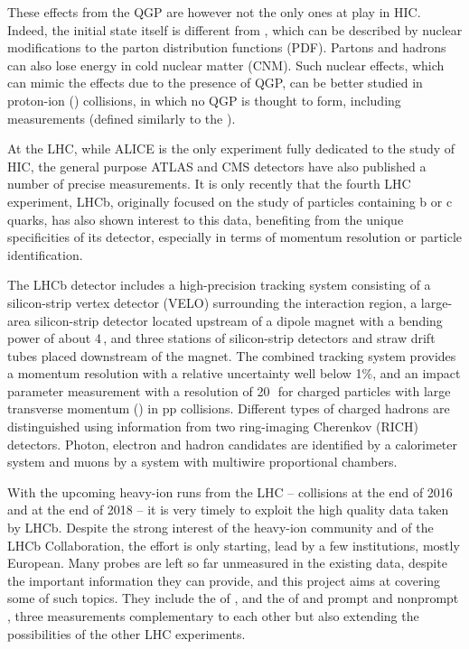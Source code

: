 \documentclass[a4paper,11pt]{article}
\begin{document}
These effects from the QGP are however not the only ones at play in HIC. Indeed, the initial state itself is different from \pp, which can be described by nuclear modifications to the parton distribution functions (PDF). Partons and hadrons can also lose energy in cold nuclear matter (CNM). Such nuclear effects, which can mimic the effects due to the presence of QGP, can be better studied in proton-ion (\pA) collisions, in which no QGP is thought to form, including \rpa measurements (defined similarly to the \raa).



At the LHC, while
ALICE is the only experiment fully dedicated to the study of HIC, the general purpose ATLAS and CMS detectors have also published a number of precise
measurements. It is only recently that the fourth LHC experiment, LHCb, originally focused on the study of particles containing b or c quarks, 
has also shown interest to this data, benefiting from the unique 
specificities of its detector, especially in terms of momentum resolution or particle identification. 

The LHCb detector includes a high-precision tracking system consisting of a silicon-strip vertex detector (VELO) surrounding the interaction region, a large-area silicon-strip detector located upstream of a dipole magnet with a bending power of about 4\,\tesla\meter, and three stations of silicon-strip detectors and straw drift tubes placed downstream of the magnet. The combined tracking system provides a momentum resolution with a relative uncertainty well below 1\%, and an impact parameter
 measurement with a resolution of 20\,\micro\meter\ for charged particles with large transverse momentum (\pt) in pp collisions. Different types of charged hadrons are distinguished using information from two ring-imaging Cherenkov (RICH) detectors. Photon, electron and hadron candidates
are identified by a calorimeter system
and muons by a system with multiwire proportional chambers.

With the upcoming heavy-ion runs from the LHC -- \ppb collisions at the end of 2016 and \pbpb at the end of 2018 --
it is very timely to exploit the high quality data taken by LHCb. Despite the strong interest of the heavy-ion community and of the LHCb Collaboration,
the effort is only starting, lead by a few institutions, mostly European. Many probes are left so far unmeasured in the existing data, despite the important
information they can provide, and this project aims at covering some of such topics. They include the \rpa of \PgUabc, and the \raa of \Dz and prompt and nonprompt \Jpsi, three measurements complementary to each other but also extending the possibilities of the other LHC experiments.
\end{document}
